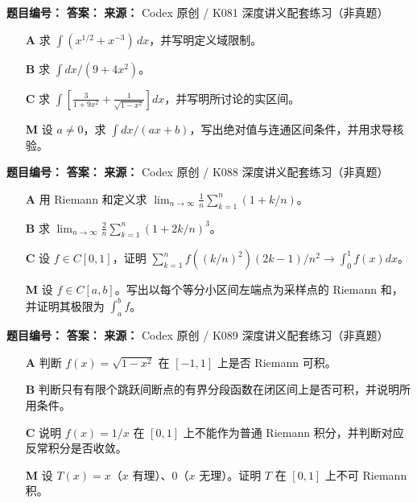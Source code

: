 \begin{problemBox}
\begin{problemMeta}
\textbf{题目编号：}  \quad
\textbf{答案：}  \quad
\textbf{来源：} Codex 原创 / K081 深度讲义配套练习（非真题）
\end{problemMeta}
\begin{enumerate}
  \item[\textbf{A}] 求 \(\int(x^{1/2}+x^{-3})\,dx\)，并写明定义域限制。
  \item[\textbf{B}] 求 \(\int dx/(9+4x^2)\)。
  \item[\textbf{C}] 求 \(\int\left[\frac3{1+9x^2}+\frac1{\sqrt{1-x^2}}\right]dx\)，并写明所讨论的实区间。
  \item[\textbf{M}] 设 \(a\ne0\)，求 \(\int dx/(ax+b)\)，写出绝对值与连通区间条件，并用求导核验。
\end{enumerate}
\end{problemBox}

\begin{problemBox}
\begin{problemMeta}
\textbf{题目编号：}  \quad
\textbf{答案：}  \quad
\textbf{来源：} Codex 原创 / K088 深度讲义配套练习（非真题）
\end{problemMeta}
\begin{enumerate}
  \item[\textbf{A}] 用 Riemann 和定义求 \(\lim_{n\to\infty}\frac1n\sum_{k=1}^n(1+k/n)\)。
  \item[\textbf{B}] 求 \(\lim_{n\to\infty}\frac2n\sum_{k=1}^n(1+2k/n)^3\)。
  \item[\textbf{C}] 设 \(f\in C[0,1]\)，证明 \(\sum_{k=1}^nf((k/n)^2)(2k-1)/n^2\to\int_0^1f(x)dx\)。
  \item[\textbf{M}] 设 \(f\in C[a,b]\)。写出以每个等分小区间左端点为采样点的 Riemann 和，并证明其极限为 \(\int_a^bf\)。
\end{enumerate}
\end{problemBox}

\begin{problemBox}
\begin{problemMeta}
\textbf{题目编号：}  \quad
\textbf{答案：}  \quad
\textbf{来源：} Codex 原创 / K089 深度讲义配套练习（非真题）
\end{problemMeta}
\begin{enumerate}
  \item[\textbf{A}] 判断 \(f(x)=\sqrt{1-x^2}\) 在 \([-1,1]\) 上是否 Riemann 可积。
  \item[\textbf{B}] 判断只有有限个跳跃间断点的有界分段函数在闭区间上是否可积，并说明所用条件。
  \item[\textbf{C}] 说明 \(f(x)=1/x\) 在 \([0,1]\) 上不能作为普通 Riemann 积分，并判断对应反常积分是否收敛。
  \item[\textbf{M}] 设 \(T(x)=x\)（\(x\) 有理）、\(0\)（\(x\) 无理）。证明 \(T\) 在 \([0,1]\) 上不可 Riemann 积。
\end{enumerate}
\end{problemBox}


